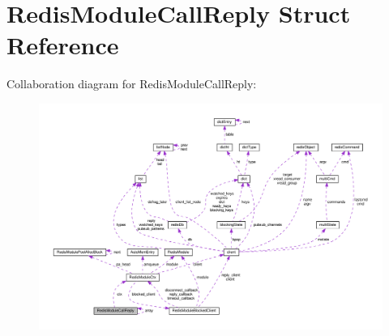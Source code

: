 \hypertarget{struct_redis_module_call_reply}{}\section{Redis\+Module\+Call\+Reply Struct Reference}
\label{struct_redis_module_call_reply}


Collaboration diagram for Redis\+Module\+Call\+Reply\+:
\nopagebreak
\begin{figure}[H]
\begin{center}
\leavevmode
\includegraphics[width=350pt]{struct_redis_module_call_reply__coll__graph}
\end{center}
\end{figure}
